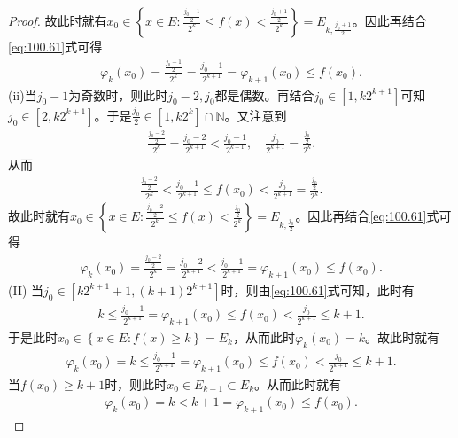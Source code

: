 \documentclass[../../main.tex]{subfiles}
\begin{document}
\begin{proof}
故此时就有$x_0\in \left\{ x\in E:\frac{\frac{j_0 - 1}{2}}{2^k}\leqslant f\left( x \right) <\frac{\frac{j_0 + 1}{2}}{2^k} \right\} =E_{k,\frac{j_0 + 1}{2}}$。因此再结合\eqref{eq:100.61}式可得
\begin{align*}
\varphi _k\left( x_0 \right) =\frac{\frac{j_0 - 1}{2}}{2^k}=\frac{j_0 - 1}{2^{k + 1}}=\varphi _{k + 1}\left( x_0 \right) \leqslant f\left( x_0 \right).
\end{align*}
(ii)当$j_0 - 1$为奇数时，则此时$j_0 - 2,j_0$都是偶数。再结合$j_0\in \left[ 1,k2^{k + 1} \right]$可知$j_0\in \left[ 2,k2^{k + 1} \right]$。于是$\frac{j_0}{2}\in \left[ 1,k2^k \right] \cap \mathbb{N}$。又注意到
\begin{align*}
\frac{\frac{j_0 - 2}{2}}{2^k}=\frac{j_0 - 2}{2^{k + 1}}<\frac{j_0 - 1}{2^{k + 1}}, \quad \frac{j_0}{2^{k + 1}}=\frac{\frac{j_0}{2}}{2^k}.
\end{align*}
从而
\begin{align*}
\frac{\frac{j_0 - 2}{2}}{2^k}<\frac{j_0 - 1}{2^{k + 1}}\leqslant f\left( x_0 \right) <\frac{j_0}{2^{k + 1}}=\frac{\frac{j_0}{2}}{2^k}.
\end{align*}
故此时就有$x_0\in \left\{ x\in E:\frac{\frac{j_0 - 2}{2}}{2^k}\leqslant f\left( x \right) <\frac{\frac{j_0}{2}}{2^k} \right\} =E_{k,\frac{j_0}{2}}$。因此再结合\eqref{eq:100.61}式可得
\begin{align*}
\varphi _k\left( x_0 \right) =\frac{\frac{j_0 - 2}{2}}{2^k}=\frac{j_0 - 2}{2^{k + 1}}<\frac{j_0 - 1}{2^{k + 1}}=\varphi _{k + 1}\left( x_0 \right) \leqslant f\left( x_0 \right).
\end{align*}
(II) 当$j_0\in \left[ k2^{k + 1}+1,(k + 1)2^{k + 1} \right]$时，则由\eqref{eq:100.61}式可知，此时有
\begin{align*}
k\leqslant \frac{j_0 - 1}{2^{k + 1}}=\varphi _{k + 1}\left( x_0 \right) \leqslant f\left( x_0 \right) <\frac{j_0}{2^{k + 1}}\leqslant k + 1.
\end{align*}
于是此时$x_0\in \left\{ x\in E:f\left( x \right) \geqslant k \right\} =E_k$，从而此时$\varphi _k\left( x_0 \right) =k$。故此时就有
\begin{align*}
\varphi _k\left( x_0 \right) =k\leqslant \frac{j_0 - 1}{2^{k + 1}}=\varphi _{k + 1}\left( x_0 \right) \leqslant f\left( x_0 \right) <\frac{j_0}{2^{k + 1}}\leqslant k + 1.
\end{align*}
\two 当$f\left( x_0 \right) \geqslant k + 1$时，则此时$x_0\in E_{k + 1}\subset E_k$。从而此时就有
\begin{align*}
\varphi _k\left( x_0 \right) =k<k + 1=\varphi _{k + 1}\left( x_0 \right) \leqslant f\left( x_0 \right).

\end{align*}
\end{proof}
\end{document}
